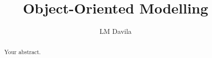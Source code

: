 \documentclass{article}
\title{Object-Oriented Modelling}
\author{LM Davila}
\begin{document}
\maketitle
\begin{abstract}
	Your abstract.
\end{abstract}

 
\newpage


\printglossaries
\end{document}
